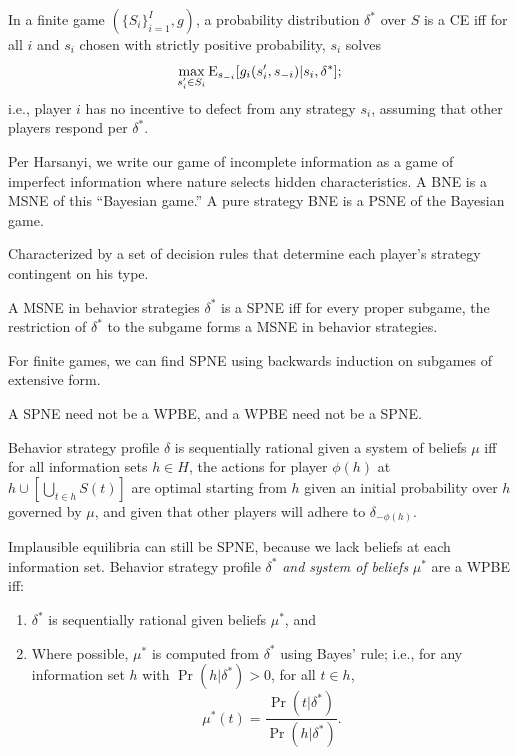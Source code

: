 \documentclass[8pt,letterpaper, landscape]{extarticle} %
\begin{document}
\begin{multicols}{3}
\begin{description}
 In a finite game $ (\{ S_i \}_{i=1}^{I}, g) $, a probability distribution $ \delta^* $ over $ S $ is a CE iff for all $  i $ and $ s_i $ chosen with strictly positive probability, $ s_i $ solves
\[ \max_{s_{i}' \in S_i} \operatorname{E}_{s_{-i}} [g_i (s_{i}' , s_{-i}) | s_i , \delta^* ] ; \]
i.e., player $ i $ has no incentive to defect from any strategy $ s_i $, assuming that other players respond per $ \delta^* $.

 Per Harsanyi, we write our game of incomplete information as a game of imperfect information where nature selects hidden characteristics. A BNE is a MSNE of this ``Bayesian game.'' A pure strategy BNE is a PSNE of the Bayesian game.

Characterized by a set of decision rules that determine each player's strategy contingent on his type.

 A MSNE in behavior strategies $ \delta^* $ is a SPNE iff for every proper subgame, the restriction of $ \delta^* $ to the subgame forms a MSNE in behavior strategies.

For finite games, we can find SPNE using backwards induction on subgames of extensive form.

A SPNE need not be a WPBE, and a WPBE need not be a SPNE.

 Behavior strategy profile $ \delta $ is sequentially rational given a system of beliefs $ \mu  $ iff for all information sets $ h \in H $, the actions for player $ \phi(h) $ at $ h \cup [\bigcup_{t \in h} S(t)] $ are optimal starting from $ h $ given an initial probability over $ h $ governed by $ \mu $, and given that other players will adhere to $ \delta_{-\phi(h)} $.

 Implausible equilibria can still be SPNE, because we lack beliefs at each information set. Behavior strategy profile $ \delta^* $ \textit{and system of beliefs} $ \mu^* $ are a WPBE iff:
\begin{enumerate}
\item $ \delta^* $ is sequentially rational given beliefs $ \mu^* $, and
\item Where possible, $ \mu^* $ is computed from $ \delta^* $ using Bayes' rule; i.e., for any information set $ h $ with $ \Pr (h | \delta^*) > 0 $, for all $ t \in h $,
\[ \mu^* (t) = \frac{\Pr (t | \delta^*)}{\Pr (h | \delta^*) }. \]
\end{enumerate}


\end{description}
\end{multicols}
\end{document}
